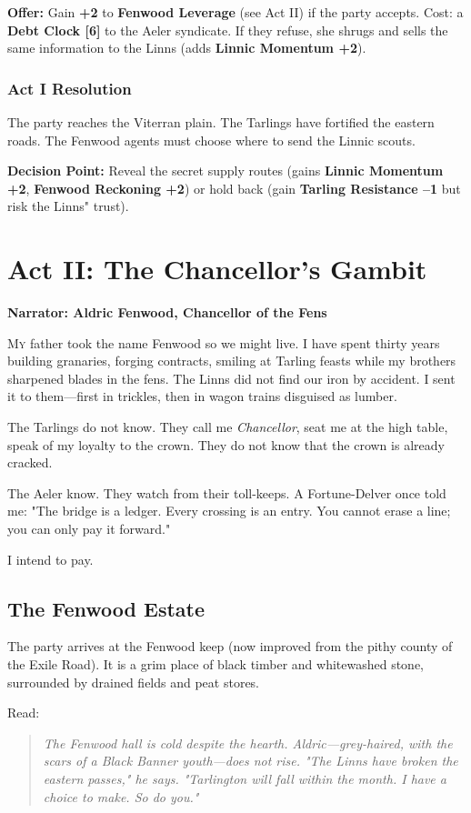 \documentclass[11pt]{book}
\begin{document}
\textbf{Offer:} Gain \textbf{+2} to \textbf{Fenwood Leverage} (see Act II) if the party accepts. Cost: a \textbf{Debt Clock [6]} to the Aeler syndicate. If they refuse, she shrugs and sells the same information to the Linns (adds \textbf{Linnic Momentum +2}).

\subsection*{Act I Resolution}
The party reaches the Viterran plain. The Tarlings have fortified the eastern roads. The Fenwood agents must choose where to send the Linnic scouts.

\textbf{Decision Point:} Reveal the secret supply routes (gains \textbf{Linnic Momentum +2}, \textbf{Fenwood Reckoning +2}) or hold back (gain \textbf{Tarling Resistance --1} but risk the Linns" trust).

\clearpage

\chapter{Act II: The Chancellor's Gambit}
\textbf{Narrator: Aldric Fenwood, Chancellor of the Fens}

\lettrine{M}{y} father took the name Fenwood so we might live. I have spent thirty years building granaries, forging contracts, smiling at Tarling feasts while my brothers sharpened blades in the fens. The Linns did not find our iron by accident. I sent it to them---first in trickles, then in wagon trains disguised as lumber.

The Tarlings do not know. They call me \textit{Chancellor}, seat me at the high table, speak of my loyalty to the crown. They do not know that the crown is already cracked.

The Aeler know. They watch from their toll-keeps. A Fortune-Delver once told me: "The bridge is a ledger. Every crossing is an entry. You cannot erase a line; you can only pay it forward."

I intend to pay.

\section*{The Fenwood Estate}
The party arrives at the Fenwood keep (now improved from the pithy county of the Exile Road). It is a grim place of black timber and whitewashed stone, surrounded by drained fields and peat stores.

Read:
\begin{quote}
\emph{The Fenwood hall is cold despite the hearth. Aldric---grey-haired, with the scars of a Black Banner youth---does not rise. "The Linns have broken the eastern passes," he says. "Tarlington will fall within the month. I have a choice to make. So do you."}
\end{quote}
\end{document}
